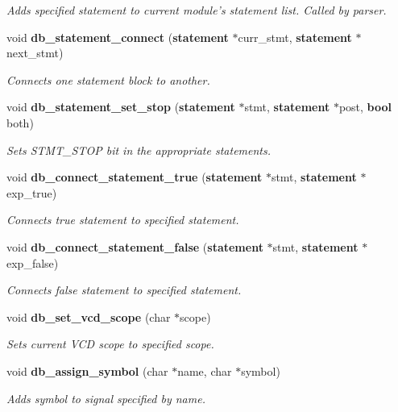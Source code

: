 \begin{CompactItemize}
\begin{CompactList}\small\item\em Adds specified statement to current module's statement list. Called by parser.\item\end{CompactList}\item 
void {\bf db\_\-statement\_\-connect} ({\bf statement} $\ast$curr\_\-stmt, {\bf statement} $\ast$next\_\-stmt)
\begin{CompactList}\small\item\em Connects one statement block to another.\item\end{CompactList}\item 
void {\bf db\_\-statement\_\-set\_\-stop} ({\bf statement} $\ast$stmt, {\bf statement} $\ast$post, {\bf bool} both)
\begin{CompactList}\small\item\em Sets STMT\_\-STOP bit in the appropriate statements.\item\end{CompactList}\item 
void {\bf db\_\-connect\_\-statement\_\-true} ({\bf statement} $\ast$stmt, {\bf statement} $\ast$exp\_\-true)
\begin{CompactList}\small\item\em Connects true statement to specified statement.\item\end{CompactList}\item 
void {\bf db\_\-connect\_\-statement\_\-false} ({\bf statement} $\ast$stmt, {\bf statement} $\ast$exp\_\-false)
\begin{CompactList}\small\item\em Connects false statement to specified statement.\item\end{CompactList}\item 
void {\bf db\_\-set\_\-vcd\_\-scope} (char $\ast$scope)
\begin{CompactList}\small\item\em Sets current VCD scope to specified scope.\item\end{CompactList}\item 
void {\bf db\_\-assign\_\-symbol} (char $\ast$name, char $\ast$symbol)
\begin{CompactList}\small\item\em Adds symbol to signal specified by name.\item\end{CompactList}\item 

\end{CompactItemize}
